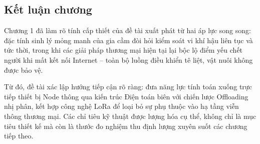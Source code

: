 \subsection{Kết luận chương}
Chương 1 đã làm rõ tính cấp thiết của đề tài xuất phát từ hai áp lực
song song: đặc tính sinh lý mỏng manh của gia cầm đòi hỏi kiểm soát vi
khí hậu liên tục và tức thời, trong khi các giải pháp thương mại hiện
tại lại bộc lộ điểm yếu chết người khi mất kết nối Internet -- toàn bộ
luồng điều khiển tê liệt, vật nuôi không được bảo vệ.

Từ đó, đề tài xác lập hướng tiếp cận rõ ràng: đưa năng lực tính toán
xuống trực tiếp thiết bị Node thông qua kiến trúc Điện toán biên với
chiến lược Offloading nhị phân, kết hợp công nghệ LoRa để loại bỏ sự
phụ thuộc vào hạ tầng viễn thông thương mại. Các chỉ tiêu kỹ thuật được
lượng hóa cụ thể, không chỉ là mục tiêu thiết kế
mà còn là thước đo nghiệm thu định lượng xuyên suốt các chương tiếp
theo.